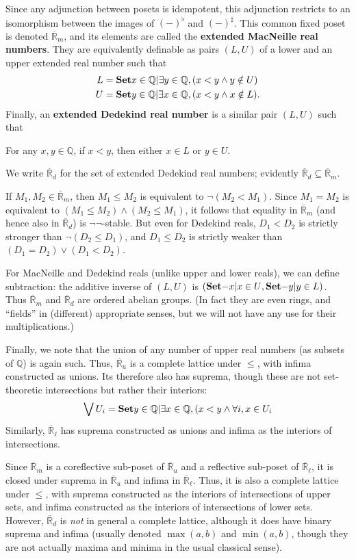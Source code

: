 \documentclass{article}
\def\Q{\mathbb{Q}}
\def\R{\mathbb{R}}
\def\Re{\overline{\R}}
\def\Red{\Re_d}
\def\Rem{\Re_m}
\def\Reu{\Re_u}
\def\Rel{\Re_{\ell}}
\def\upp#1{{#1}^{\sharp}}
\def\low#1{{#1}^{\flat}}
\def\nn{\ensuremath{\neg\neg}}
\begin{document}
Since any adjunction between posets is idempotent, this adjunction restricts to an isomorphism between the images of $\low{(-)}$ and $\upp{(-)}$.
This common fixed poset is denoted $\Rem$, and its elements are called the \textbf{extended MacNeille real numbers}.
They are equivalently definable as pairs $(L,U)$ of a lower and an upper extended real number such that
\begin{align*}
 L &= \setof{x\in\Q | \exists y\in \Q, (x<y \land y\notin U)}\\
 U &= \setof{y\in\Q | \exists x\in \Q, (x<y \land x\notin L)}.
\end{align*}
Finally, an \textbf{extended Dedekind real number} is a similar pair $(L,U)$ such that
\begin{center}
  For any $x,y\in\Q$, if $x<y$, then either $x\in L$ or $y\in U$.
\end{center}
We write $\Red$ for the set of extended Dedekind real numbers; evidently $\Red \subseteq \Rem$.

If $M_1,M_2\in\Rem$, then $M_1 \le M_2$ is equivalent to $\neg(M_2<M_1)$.
Since $M_1=M_2$ is equivalent to $(M_1 \le M_2) \land (M_2 \le M_1)$, it follows that equality in $\Rem$ (and hence also in $\Red$) is \nn-stable.
But even for Dedekind reals, $D_1<D_2$ is strictly stronger than $\neg(D_2 \le D_1)$, and $D_1\le D_2$ is strictly weaker than $(D_1=D_2) \lor (D_1 < D_2)$.

For MacNeille and Dedekind reals (unlike upper and lower reals), we can define subtraction: the additive inverse of $(L,U)$ is $( \setof{-x | x\in U}, \setof{-y | y\in L})$.
Thus $\Rem$ and $\Red$ are ordered abelian groups.
(In fact they are even rings, and ``fields'' in (different) appropriate senses, but we will not have any use for their multiplications.)

Finally, we note that the union of any number of upper real numbers (as subsets of $\Q$) is again such.
Thus, $\Reu$ is a complete lattice under $\le$, with infima constructed as unions.
Its therefore also has suprema, though these are not set-theoretic intersections but rather their interiors:
\[ \bigvee U_i = \setof{ y\in\Q | \exists x\in\Q, (x<y \land \forall i, x\in U_i}\]
Similarly, $\Rel$ has suprema constructed as unions and infima as the interiors of intersections.

Since $\Rem$ is a coreflective sub-poset of $\Reu$ and a reflective sub-poset of $\Rel$, it is closed under suprema in $\Reu$ and infima in $\Rel$.
Thus, it is also a complete lattice under $\le$, with suprema constructed as the interiors of intersections of upper sets, and infima constructed as the interiors of intersections of lower sets.
However, $\Red$ is \emph{not} in general a complete lattice, although it does have binary suprema and infima (usually denoted $\max(a,b)$ and $\min(a,b)$, though they are not actually maxima and minima in the usual classical sense).
\end{document}
